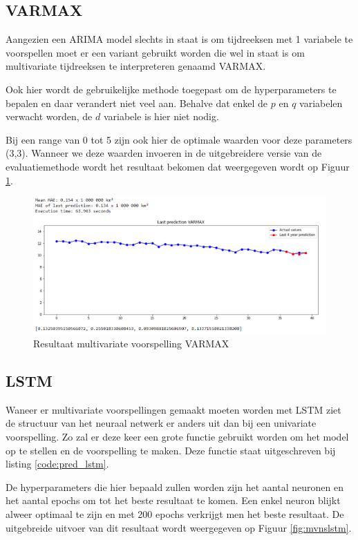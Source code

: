 \subsection{VARMAX}
Aangezien een ARIMA model slechts in staat is om tijdreeksen met 1 variabele te voorspellen moet er een variant gebruikt worden die wel in staat is om multivariate tijdreeksen te interpreteren genaamd VARMAX. 

Ook hier wordt de gebruikelijke methode toegepast om de hyperparameters te bepalen en daar verandert niet veel aan. Behalve dat enkel de $p$ en $q$ variabelen verwacht worden, de $d$ variabele is hier niet nodig. 

Bij een range van 0 tot 5 zijn ook hier de optimale waarden voor deze parameters (3,3). Wanneer we deze waarden invoeren in de uitgebreidere versie van de evaluatiemethode wordt het resultaat bekomen dat weergegeven wordt op Figuur \ref{fig:mvnsvarmax}.

\begin{figure}
    \centering
    \caption{Resultaat multivariate voorspelling VARMAX}
    \label{fig:mvnsvarmax}
    \includegraphics[width=1\linewidth]{mv_ns_varmax}
\end{figure}


\subsection{LSTM}

Waneer er multivariate voorspellingen gemaakt moeten worden met LSTM ziet de structuur van het neuraal netwerk er anders uit dan bij een univariate voorspelling. Zo zal er deze keer een grote functie gebruikt worden om het model op te stellen en de voorspelling te maken. Deze functie staat uitgeschreven bij listing \ref{code:pred_lstm}.

De hyperparameters die hier bepaald zullen worden zijn het aantal neuronen en het aantal epochs om tot het beste resultaat te komen. Een enkel neuron blijkt alweer optimaal te zijn en met 200 epochs verkrijgt men het beste resultaat. De uitgebreide uitvoer van dit resultaat wordt weergegeven op Figuur \ref{fig:mvnslstm}.

